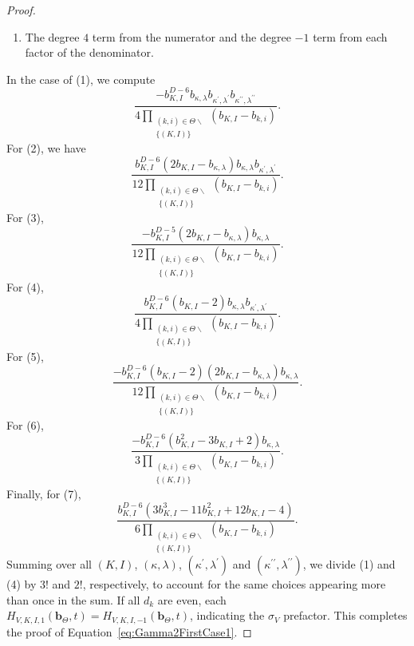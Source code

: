 \documentclass{amsart}
\theoremstyle{definition}
\theoremstyle{remark}
\newcommand{\bs}{\boldsymbol}
\begin{document}
\begin{proof}
\begin{enumerate}
\item   The degree $4$ term from the numerator and the degree $-1$ term from each factor of the denominator.
\end{enumerate}

In the case of (1), we compute
\[
    \frac{-b_{K,I}^{D-6} b_{\kappa,\lambda}b_{\kappa^\prime,\lambda^\prime}b_{\kappa^{\prime\prime},\lambda^{\prime\prime}}}
        {4\prod\limits_{\substack{(k,i)\in\Theta\smallsetminus \\ \{ (K,I)\} }} (b_{K,I} - b_{k,i})}.
\]
For (2), we have
\[
    \frac{b_{K,I}^{D-6} (2 b_{K,I} - b_{\kappa,\lambda}) b_{\kappa,\lambda}b_{\kappa^\prime,\lambda^\prime}}
        {12\prod\limits_{\substack{(k,i)\in\Theta\smallsetminus \\ \{ (K,I)\} }} (b_{K,I} - b_{k,i})}.
\]
For (3),
\[
    \frac{-b_{K,I}^{D-5} (2 b_{K,I} - b_{\kappa,\lambda}) b_{\kappa,\lambda}}
        {12\prod\limits_{\substack{(k,i)\in\Theta\smallsetminus \\ \{ (K,I)\} }} (b_{K,I} - b_{k,i})}.
\]
For (4),
\[
    \frac{b_{K,I}^{D-6} (b_{K,I} - 2) b_{\kappa,\lambda}b_{\kappa^\prime,\lambda^\prime}}
        {4\prod\limits_{\substack{(k,i)\in\Theta\smallsetminus \\ \{ (K,I)\} }} (b_{K,I} - b_{k,i})}.
\]
For (5),
\[
    \frac{-b_{K,I}^{D-6} (b_{K,I} - 2)(2 b_{K,I} - b_{\kappa,\lambda}) b_{\kappa,\lambda}}
        {12\prod\limits_{\substack{(k,i)\in\Theta\smallsetminus \\ \{ (K,I)\} }} (b_{K,I} - b_{k,i})}.
\]
For (6),
\[
    \frac{-b_{K,I}^{D-6} (b_{K,I}^2 - 3b_{K,I} + 2) b_{\kappa,\lambda}}
        {3\prod\limits_{\substack{(k,i)\in\Theta\smallsetminus \\ \{ (K,I)\} }} (b_{K,I} - b_{k,i})}.
\]
Finally, for (7),
\[
    \frac{b_{K,I}^{D-6} (3b_{K,I}^3 - 11b_{K,I}^2 + 12b_{K,I} - 4) }
        {6\prod\limits_{\substack{(k,i)\in\Theta\smallsetminus \\ \{ (K,I)\} }} (b_{K,I} - b_{k,i})}.
\]
Summing over all $(K,I)$, $(\kappa,\lambda)$, $(\kappa^\prime,\lambda^\prime)$ and $(\kappa^{\prime\prime},\lambda^{\prime\prime})$, we divide
(1) and (4) by $3!$ and $2!$, respectively, to account for the same choices appearing more than once
in the sum. If all $d_k$ are even, each $H_{V,K,I,1}(\bs{b}_\Theta,t) = H_{V,K,I,-1}(\bs{b}_\Theta,t)$, indicating
the $\sigma_V$ prefactor. This completes the proof of Equation~\eqref{eq:Gamma2FirstCase1}.


\end{proof}
\end{document}
